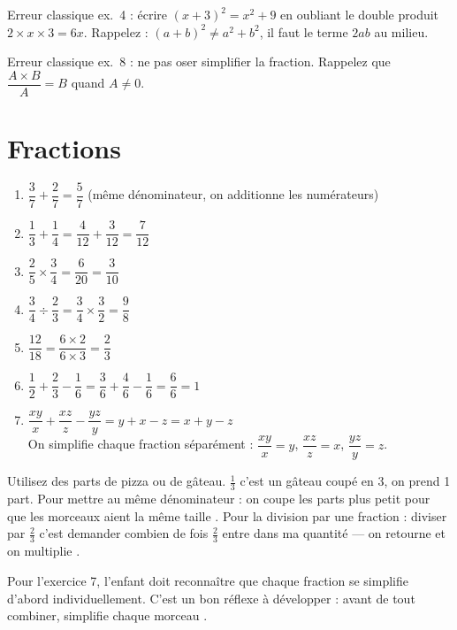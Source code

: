 \documentclass[11pt,a4paper]{article}
\newcommand{\corrbox}[1]{
\begin{tcolorbox}[colback=correctgreen!8!white,colframe=correctgreen!60!black]
#1
\end{tcolorbox}
}
\newcommand{\tipbox}[1]{
\begin{tcolorbox}[colback=tipblue!8!white,colframe=tipblue!60!black,title=\textbf{Comment expliquer}]
#1
\end{tcolorbox}
}
\newcommand{\warnbox}[1]{
\begin{tcolorbox}[colback=warnred!8!white,colframe=warnred!60!black,title=\textbf{Erreurs fr\'equentes}]
#1
\end{tcolorbox}
}
\begin{document}
\warnbox{
Erreur classique ex.~4 : \'ecrire $(x + 3)^{2} = x^{2} + 9$ en oubliant le double produit $2 \times x \times 3 = 6x$. Rappelez : $(a+b)^{2} \neq a^{2} + b^{2}$, il faut le terme $2ab$ au milieu.

\vspace{0.2cm}
Erreur classique ex.~8 : ne pas oser simplifier la fraction. Rappelez que $\dfrac{A \times B}{A} = B$ quand $A \neq 0$.
}

\section{Fractions}

\corrbox{
\begin{enumerate}
\item $\dfrac{3}{7} + \dfrac{2}{7} = \dfrac{5}{7}$ \quad (m\^eme d\'enominateur, on additionne les num\'erateurs)
\item $\dfrac{1}{3} + \dfrac{1}{4} = \dfrac{4}{12} + \dfrac{3}{12} = \dfrac{7}{12}$
\item $\dfrac{2}{5} \times \dfrac{3}{4} = \dfrac{6}{20} = \dfrac{3}{10}$
\item $\dfrac{3}{4} \div \dfrac{2}{3} = \dfrac{3}{4} \times \dfrac{3}{2} = \dfrac{9}{8}$
\item $\dfrac{12}{18} = \dfrac{6 \times 2}{6 \times 3} = \dfrac{2}{3}$
\item $\dfrac{1}{2} + \dfrac{2}{3} - \dfrac{1}{6} = \dfrac{3}{6} + \dfrac{4}{6} - \dfrac{1}{6} = \dfrac{6}{6} = 1$
\item $\dfrac{xy}{x} + \dfrac{xz}{z} - \dfrac{yz}{y} = y + x - z = x + y - z$\\[0.2cm]
On simplifie chaque fraction s\'epar\'ement : $\dfrac{xy}{x} = y$, \; $\dfrac{xz}{z} = x$, \; $\dfrac{yz}{y} = z$.
\end{enumerate}
}

\tipbox{
Utilisez des parts de pizza ou de g\^ateau. $\frac{1}{3}$ c'est un g\^ateau coup\'e en 3, on prend 1 part. Pour mettre au m\^eme d\'enominateur : \guillemotleft{} on coupe les parts plus petit pour que les morceaux aient la m\^eme taille \guillemotright{}. Pour la division par une fraction : \guillemotleft{} diviser par $\frac{2}{3}$ c'est demander combien de fois $\frac{2}{3}$ entre dans ma quantit\'e --- on retourne et on multiplie \guillemotright{}.

\vspace{0.2cm}
Pour l'exercice 7, l'enfant doit reconna\^itre que chaque fraction se simplifie d'abord individuellement. C'est un bon r\'eflexe \`a d\'evelopper : \guillemotleft{} avant de tout combiner, simplifie chaque morceau \guillemotright{}.
}
\end{document}
